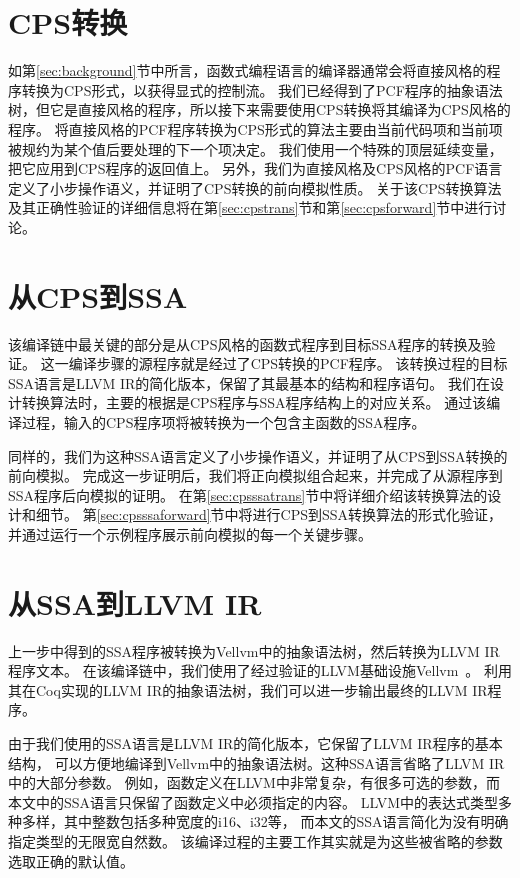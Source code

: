 \section{CPS转换}

如第\ref{sec:background}节中所言，函数式编程语言的编译器通常会将直接风格的程序转换为CPS形式，以获得显式的控制流。
我们已经得到了PCF程序的抽象语法树，但它是直接风格的程序，所以接下来需要使用CPS转换将其编译为CPS风格的程序。
将直接风格的PCF程序转换为CPS形式的算法主要由当前代码项和当前项被规约为某个值后要处理的下一个项决定。
我们使用一个特殊的顶层延续变量，把它应用到CPS程序的返回值上。
另外，我们为直接风格及CPS风格的PCF语言定义了小步操作语义，并证明了CPS转换的前向模拟性质。
关于该CPS转换算法及其正确性验证的详细信息将在第\ref{sec:cpstrans}节和第\ref{sec:cpsforward}节中进行讨论。

\section{从CPS到SSA}

该编译链中最关键的部分是从CPS风格的函数式程序到目标SSA程序的转换及验证。
这一编译步骤的源程序就是经过了CPS转换的PCF程序。
该转换过程的目标SSA语言是LLVM IR的简化版本，保留了其最基本的结构和程序语句。
我们在设计转换算法时，主要的根据是CPS程序与SSA程序结构上的对应关系。
通过该编译过程，输入的CPS程序项将被转换为一个包含主函数的SSA程序。

同样的，我们为这种SSA语言定义了小步操作语义，并证明了从CPS到SSA转换的前向模拟。
完成这一步证明后，我们将正向模拟组合起来，并完成了从源程序到SSA程序后向模拟的证明。
在第\ref{sec:cpsssatrans}节中将详细介绍该转换算法的设计和细节。
第\ref{sec:cpsssaforward}节中将进行CPS到SSA转换算法的形式化验证，并通过运行一个示例程序展示前向模拟的每一个关键步骤。

\section{从SSA到LLVM IR}

上一步中得到的SSA程序被转换为Vellvm中的抽象语法树，然后转换为LLVM IR程序文本。
在该编译链中，我们使用了经过验证的LLVM基础设施Vellvm~\cite{zakowski2021modular}。
利用其在Coq实现的LLVM IR的抽象语法树，我们可以进一步输出最终的LLVM IR程序。

由于我们使用的SSA语言是LLVM IR的简化版本，它保留了LLVM IR程序的基本结构，
可以方便地编译到Vellvm中的抽象语法树。这种SSA语言省略了LLVM IR中的大部分参数。
例如，函数定义在LLVM中非常复杂，有很多可选的参数，而本文中的SSA语言只保留了函数定义中必须指定的内容。
LLVM中的表达式类型多种多样，其中整数包括多种宽度的i16、i32等，
而本文的SSA语言简化为没有明确指定类型的无限宽自然数。
该编译过程的主要工作其实就是为这些被省略的参数选取正确的默认值。

